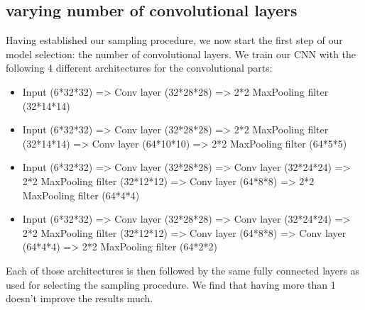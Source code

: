 \subsection{varying number of convolutional layers}

Having established our sampling procedure, we now start the first step of our model selection: the number of convolutional layers. We train our CNN with the following 4 different architectures for the convolutional parts:

\begin{itemize}
	\item Input (6*32*32) => Conv layer (32*28*28) => 2*2 MaxPooling filter (32*14*14) 
	\item Input (6*32*32) => Conv layer (32*28*28) => 2*2 MaxPooling filter (32*14*14) => Conv layer (64*10*10) => 2*2 MaxPooling filter (64*5*5)
	\item Input (6*32*32) => Conv layer (32*28*28) => Conv layer (32*24*24) => 2*2 MaxPooling filter (32*12*12) => Conv layer (64*8*8) => 2*2 MaxPooling filter (64*4*4)
	\item Input (6*32*32) => Conv layer (32*28*28) => Conv layer (32*24*24) => 2*2 MaxPooling filter (32*12*12) => Conv layer (64*8*8) => Conv layer (64*4*4) => 2*2 MaxPooling filter (64*2*2)
\end{itemize}

Each of those architectures is then followed by the same fully connected layers as used for selecting the sampling procedure. We find that having more than 1 doesn't improve the results much. 

